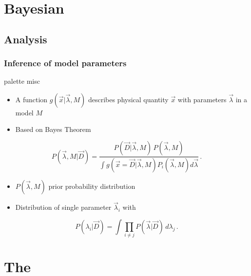 \documentclass{beamer}
\begin{document}
\section{Bayesian}
\subsection{Analysis}
\begin{frame}
	\frametitle{Inference of model parameters}\vspace{-5mm}
	\begin{beamercolorbox}[rounded=true,shadow=true]{palette misc}
		\begin{itemize}
			\item A function $g(\vec{x}|\vec{\lambda},M)$ describes physical quantity $\vec{x}$ with parameters $\vec{\lambda}$ in a model $M$ 
			\item Based on Bayes Theorem
		\end{itemize}
		\begin{equation*}
		P(\vec{\lambda},M|\vec{D}) = \frac{P(\vec{D}|\vec{\lambda},M) \, P(\vec{\lambda},M)}{\int \! g(\vec{x}=\vec{D}|\vec{\lambda},M) P_i(\vec{\lambda},M)  d\vec{\lambda}} \, .
		\end{equation*}
		\begin{itemize}
			\item $P(\vec{\lambda},M)$ prior probability distribution
			\item Distribution of single parameter $\vec{\lambda}_i$ with
		\end{itemize}
		\begin{equation*}
		P(\lambda_i|\vec{D}) = \int \prod_{i \neq j} P(\vec{\lambda}|\vec{D}) \, d\lambda_{j} \, .
		\end{equation*}
	\end{beamercolorbox}
\end{frame}

\section{The}
\end{document}
